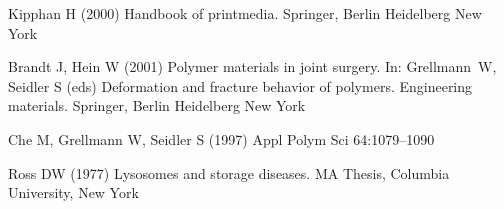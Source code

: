 %
%

%
% 
% 
%
\begin{thebibliography}{99.}
%
%
%
 Kipphan H (2000)
Handbook of printmedia. Springer, Berlin Heidelberg New York

 Brandt J, Hein W (2001) Polymer materials in
joint surgery. In: Grellmann~W, Seidler S (eds)
Deformation and fracture behavior of polymers. Engineering
materials. Springer, Berlin Heidelberg New York

 Che M, Grellmann W, Seidler S (1997)
Appl Polym Sci 64:1079--1090

 Ross DW (1977) Lysosomes and storage diseases. MA
Thesis, Columbia University, New York

\end{thebibliography}
